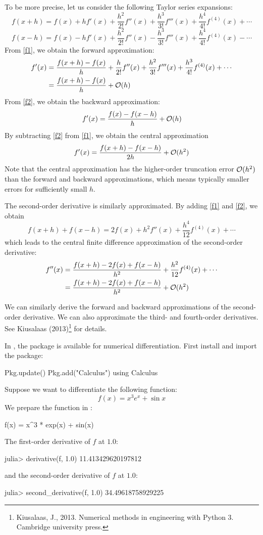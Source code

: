 To be more precise, let us consider the following Taylor series expansions:
\begin{equation}
\label{f1}
f(x+h) = f(x) + hf'(x) + \frac{h^2}{2!}f''(x) + \frac{h^3}{3!}f'''(x) + \frac{h^4}{4!}f^{(4)}(x) + \cdots
\end{equation}
\begin{equation}
\label{f2}
f(x-h) = f(x) - hf'(x) + \frac{h^2}{2!}f''(x) - \frac{h^3}{3!}f'''(x) + \frac{h^4}{4!}f^{(4)}(x) - \cdots
\end{equation}
From \eqref{f1}, we obtain the forward approximation:
\begin{align*}
f'(x) &= \frac{f(x+h)-f(x)}{h} + \frac{h}{2!}f''(x) + \frac{h^2}{3!}f'''(x) + \frac{h^3}{4!}f^{(4)}(x) + \cdots \\
	  &= \frac{f(x+h)-f(x)}{h} + \mathcal{O}(h)
\end{align*}
From \eqref{f2}, we obtain the backward approximation:
\[
f'(x) = \frac{f(x)-f(x-h)}{h} + \mathcal{O}(h)
\]
By subtracting \eqref{f2} from \eqref{f1}, we obtain the central approximation
\[
f'(x) = \frac{f(x+h)-f(x-h)}{2h} + \mathcal{O}(h^2)
\]
Note that the central approximation has the higher-order truncation error $\mathcal{O}(h^2)$ than the forward and backward approximations, which means typically smaller errors for sufficiently small $h$.

The second-order derivative is similarly approximated. By adding \eqref{f1} and \eqref{f2}, we obtain
\[
f(x+h) + f(x-h) = 2f(x) + h^2f''(x) + \frac{h^4}{12}f^{(4)}(x) + \cdots
\]
which leads to the central finite difference approximation of the second-order derivative:
\begin{align*}
f''(x) &= \frac{f(x+h)-2f(x)+f(x-h)}{h^2} + \frac{h^2}{12}f^{(4)}(x) + \cdots \\
		&= \frac{f(x+h)-2f(x)+f(x-h)}{h^2} +  \mathcal{O}(h^2)
\end{align*}

We can similarly derive the forward and backward approximations of the second-order derivative. We can also approximate the third- and fourth-order derivatives. See Kiusalaas (2013)\footnote{Kiusalaas, J., 2013. Numerical methods in engineering with Python 3. Cambridge university press.} for details.

In \julia{}, the  package is available for numerical differentiation. First install and import the package:
\begin{code}
Pkg.update()
Pkg.add("Calculus")
using Calculus
\end{code}
Suppose we want to differentiate the following function:
\[
	f(x) = x^3 e^x + \sin x
\]
We prepare the function in \julia{}:
\begin{code}
f(x) = x^3 * exp(x) + sin(x)
\end{code}
\noindent The first-order derivative of $f$ at $1.0$:
\begin{code}
julia> derivative(f, 1.0)
11.413429620197812
\end{code}
\noindent and the second-order derivative of $f$ at $1.0$:
\begin{code}
julia> second_derivative(f, 1.0)
34.49618758929225
\end{code}

